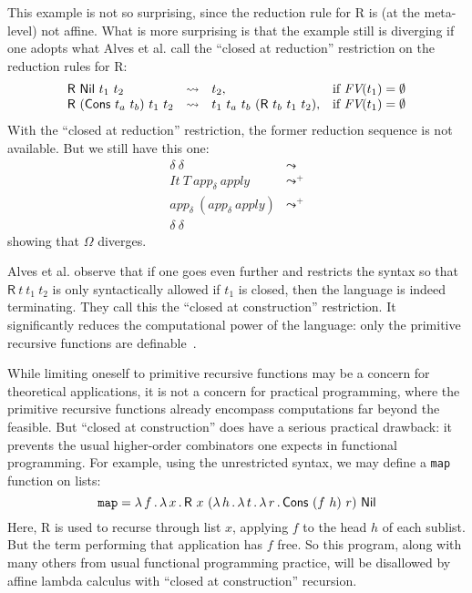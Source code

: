 \documentclass{article}
\begin{document}
This example is not so surprising, since the reduction rule for
\textsf{R} is (at the meta-level) not affine.  What is more surprising
is that the example still is diverging if one adopts what Alves et al.
call the ``closed at reduction'' restriction on the reduction
rules for \textsf{R}:
  \[
  \begin{array}{lllll}
    \mathsf{R}\ \mathsf{Nil}\ t_1\ t_2 & \leadsto & t_2, & \textnormal{if } \textit{FV}(t_1) = \emptyset\\
    \mathsf{R}\ (\mathsf{Cons}\ t_a\ t_b)\ t_1\ t_2 & \leadsto & t_1\ t_a\ t_b\ (\mathsf{R}\ t_b\ t_1\ t_2),& \textnormal{if } \textit{FV}(t_1) = \emptyset
  \end{array}
  \]
\noindent With the ``closed at reduction'' restriction, the former
reduction sequence is not available.  But we still have this one:
\[
\begin{array}{ll}
  \delta\ \delta & \leadsto \\
  \textit{It}\ T\ \textit{app}_\delta\ \textit{apply} & \leadsto^+ \\
  \textit{app}_\delta\ (\textit{app}_\delta\ \textit{apply}) & \leadsto^+ \\
  \delta\ \delta& \
\end{array}
\]
\noindent showing that $\Omega$ diverges.

Alves et al. observe that if one goes even further and restricts the
syntax so that $\mathsf{R}\ t\ t_1\ t_2$ is only syntactically allowed
if $t_1$ is closed, then the language is indeed terminating.  They
call this the ``closed at construction'' restriction.  It
significantly reduces the computational power of the language: only
the primitive recursive functions are definable~\cite{alves10}.

While limiting oneself to primitive recursive functions may be a
concern for theoretical applications, it is not a concern for
practical programming, where the primitive recursive functions already
encompass computations far beyond the feasible.  But ``closed at construction''
does have a serious practical drawback: it prevents the usual higher-order
combinators one expects in functional programming.  For example, using the
unrestricted syntax, we may define a \texttt{map} function on lists:
\[
\texttt{map} = \lam{f}{\lam{x}{\mathsf{R}\ x\ (\lam{h}{\lam{t}{\lam{r}{\mathsf{Cons}\ (f\ h)\ r}}})\ \mathsf{Nil}}}
\]
\noindent Here, \textsf{R} is used to recurse through list $x$,
applying $f$ to the head $h$ of each sublist.  But the term performing
that application has $f$ free.  So this program, along with many
others from usual functional programming practice, will be disallowed
by affine lambda calculus with ``closed at construction'' recursion.
\end{document}

